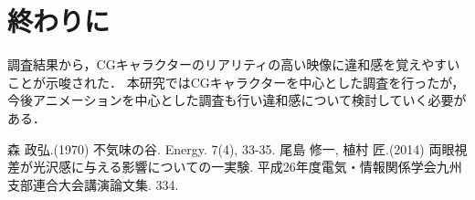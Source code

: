 \documentclass[twocolumn,10pt,a4j]{ltjsarticle}
\begin{document}
\section{終わりに}
  調査結果から，CGキャラクターのリアリティの高い映像に違和感を覚えやすいことが示唆された．
  本研究ではCGキャラクターを中心とした調査を行ったが，今後アニメーションを中心とした調査も行い違和感について検討していく必要がある．

\begin{thebibliography}{99}
  森 政弘.(1970) 不気味の谷. Energy. 7(4), 33-35.
  尾島 修一, 植村 匠.(2014) 両眼視差が光沢感に与える影響についての一実験. 平成26年度電気・情報関係学会九州支部連合大会講演論文集. 334.

\end{thebibliography}
\end{document}
